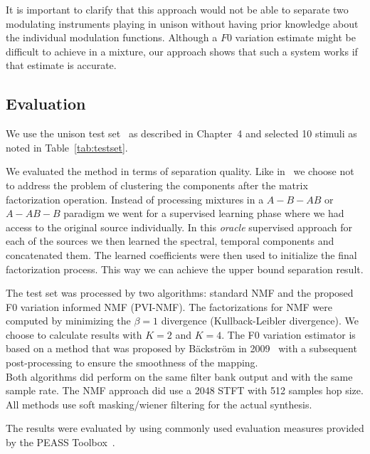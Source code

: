 It is important to clarify that this approach would not be able to separate two modulating instruments playing in unison without having prior knowledge about the individual modulation functions. Although a $F0$ variation estimate might be difficult to achieve in a mixture, our approach shows that such a system works if that estimate is accurate.

\subsection{Evaluation}
We use the unison test set~\cite{oss_unison} as described in Chapter~4 and selected 10 stimuli as noted in Table~\ref{tab:testset}.

We evaluated the method in terms of separation quality.
Like in~\cite{barker13} we choose not to address the problem of clustering the components after the matrix factorization operation.
Instead of processing mixtures in a $A-B-AB$ or $A-AB-B$ paradigm we went for a supervised learning phase where we had access to the original source individually.
In this \emph{oracle} supervised approach for each of the sources we then learned the spectral, temporal components and concatenated them. The learned coefficients were then used to initialize the final factorization process. This way we can achieve the upper bound separation result.

The test set was processed by two algorithms: standard NMF and the proposed F0 variation informed NMF (PVI-NMF). The factorizations for NMF were computed by minimizing the $\beta = 1$ divergence (Kullback-Leibler divergence).
We choose to calculate results with $K=2$ and $K=4$.
The F0 variation estimator is based on a method that was proposed by B\"ackstr\"om in 2009~\cite{backstrom09} with a subsequent post-processing to ensure the smoothness of the mapping. \\

Both algorithms did perform on the same filter bank output and with the same sample rate. The NMF approach did use a 2048 STFT with 512 samples hop size.
All methods use soft masking/wiener filtering for the actual synthesis.

The results were evaluated by using commonly used evaluation measures provided by the {PEASS} Toolbox~\cite{emiya11}. 

